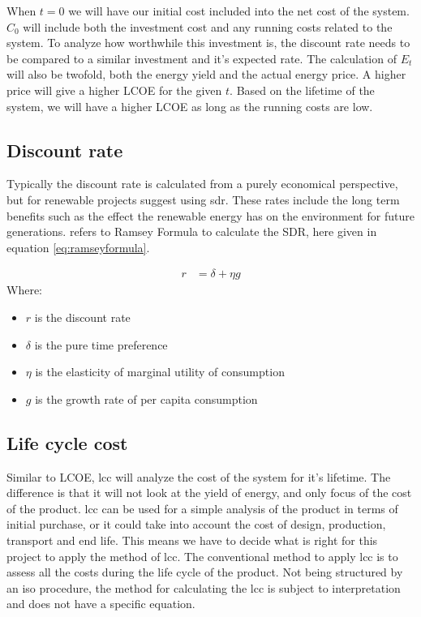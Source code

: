 When $t=0$ we will have our initial cost included into the net cost of the system. $C_0$ will include both the investment cost and any running costs related to the system. To analyze how worthwhile this investment is, the discount rate needs to be compared to a similar investment and it's expected rate. The calculation of $E_t$ will also be twofold, both the energy yield and the actual energy price. A higher price will give a higher LCOE for the given $t$. Based on the lifetime of the system, we will have a higher LCOE as long as the running costs are low. 

\subsection{Discount rate}
Typically the discount rate is calculated from a purely economical perspective, but for renewable projects \citep{sarahleeUltimateSocialDiscount2025} suggest using \acrfull{sdr}. These rates include the long term benefits such as the effect the renewable energy has on the environment for future generations. \citep{sarahleeUltimateSocialDiscount2025} refers to Ramsey Formula to calculate the SDR, here given in equation \eqref{eq:ramseyformula}.

\begin{align}
    r & = \delta + \eta g
    \label{eq:ramseyformula}
\end{align}
Where:
\begin{itemize}
    \item $r$ is the discount rate
    \item $\delta$ is the pure time preference
    \item  $\eta$ is the elasticity of marginal utility of consumption
    \item  $g$ is the growth rate of per capita consumption
\end{itemize}


\subsection{Life cycle cost}
Similar to LCOE, \acrfull{lcc} will analyze the cost of the system for it's lifetime. The difference is that it will not look at the yield of energy, and only focus of the cost of the product\citep{tonioloLifeCycleThinking2020}. \acrshort{lcc} can be used for a simple analysis of the product in terms of initial purchase, or it could take into account the cost of design, production, transport and end life\citep{tonioloLifeCycleThinking2020}. This means we have to decide what is right for this project to apply the method of \acrshort{lcc}. The conventional method to apply \acrshort{lcc} is to assess all the costs during the life cycle of the product\citep{tonioloLifeCycleThinking2020}. Not being structured by an \acrfull{iso} procedure, the method for calculating the \acrshort{lcc} is subject to interpretation and does not have a specific equation. 


